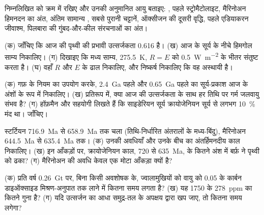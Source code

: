 \begin{exercise}[$\star$]\label{exo:b2:precambrian-earth:4}
निम्नलिखित को क्रम में रखिए और उनकी अनुमानित आयु बताइए: ,
पहले स्ट्रोमैटोलाइट, मैरिनोअन हिमनदन का अंत, अंतिम सामान्य ,
सबसे पुरानी चट्टानें, ऑक्सीजन की दूसरी वृद्धि, पहले एडियाकरन जीवाश्म, पिलबारा की गुंबद-और-कील
संरचनाओं का अंत।
\end{exercise}

\begin{exercise}[$\star\star$]\label{exo:b2:precambrian-earth:5}
(क) जाँचिए कि आज की पृथ्वी की प्रभावी उत्सर्जकता 0.616 है। (ख) आज के सूर्य के नीचे हिमगोल
साम्य निकालिए। (ग) दिखाइए कि मध्य साम्य, \qty{275.5}{K}, $R = E$ को
\qty{0.5}{W.m^{-2}} के भीतर संतुष्ट करता है। (घ) वहाँ $R$ और $E$ के ढाल निकालिए, और निष्कर्ष निकालिए
कि वह अस्थायी है।
\end{exercise}

\begin{exercise}[$\star\star$]\label{exo:b2:precambrian-earth:6}
(क) गफ़ के नियम का उपयोग करके, \qty{2.4}{Ga} पहले और \qty{0.65}{Ga} पहले का सूर्य-प्रकाश आज के
अंशों के रूप में निकालिए। (ख) प्रतिरूप में, क्या आज की उत्सर्जकता के साथ हर तिथि पर गर्म जलवायु संभव है?
(ग) हॉफ़मैन और सहयोगी लिखते हैं कि साइडेरियन सूर्य क्रायोजेनियन सूर्य से लगभग \qty{10}{\percent} मंद
था। जाँचिए।
\end{exercise}

\begin{exercise}[$\star\star$]\label{exo:b2:precambrian-earth:7}
स्टर्टियन \qty{716.9}{Ma} से \qty{658.9}{Ma} तक चला (तिथि-निर्धारित अंतरालों के मध्य-बिंदु),
मैरिनोअन \qty{644.5}{Ma} से \qty{635.4}{Ma} तक। (क) उनकी अवधियाँ और उनके बीच का
अंतर्हिमनदीय काल निकालिए। (ख) इन आँकड़ों पर, क्रायोजेनियन काल, 720 से \qty{635}{Ma}, के कितने अंश में
बर्फ़ ने पृथ्वी को ढका? (ग) मैरिनोअन की अवधि केवल एक
मोटा आँकड़ा क्यों है?
\end{exercise}

\begin{exercise}[$\star\star$]\label{exo:b2:precambrian-earth:8}
(क) प्रति वर्ष \qty{0.26}{Gt} पर, बिना किसी अवशोषक के, ज्वालामुखियों को वायु को
0.05 के कार्बन डाइऑक्साइड मिश्रण-अनुपात तक लाने में कितना समय लगता है? (ख) यह 1750 के \qty{278}{ppm} का कितने गुना है? (ग) यदि उत्सर्जन का आधा समुद्र-तल
के अपक्षय द्वारा खप जाए, तो कितना समय लगेगा?
\end{exercise}

